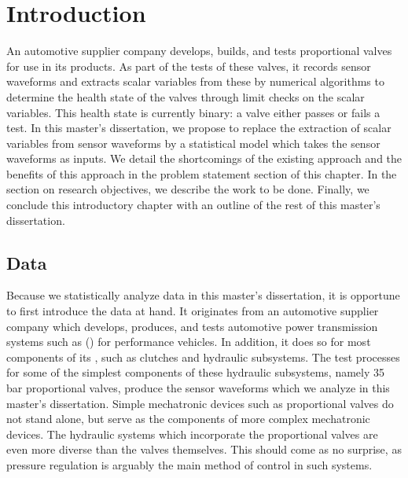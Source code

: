 \chapter{Introduction}

An automotive supplier company develops, builds, and tests proportional valves for use in its products.
As part of the tests of these valves, it records sensor waveforms and extracts scalar variables from these by numerical algorithms to determine the health state of the valves through limit checks on the scalar variables.
This health state is currently binary: a valve either passes or fails a test.
In this master's dissertation, we propose to replace the extraction of scalar variables from sensor waveforms by a statistical model which takes the sensor waveforms as inputs.
We detail the shortcomings of the existing approach and the benefits of this approach in the problem statement section of this chapter.
In the section on research objectives, we describe the work to be done.
Finally, we conclude this introductory chapter with an outline of the rest of this master's dissertation.

\section{Data}

Because we statistically analyze data in this master's dissertation, it is opportune to first introduce the data at hand.
It originates from an automotive supplier company which develops, produces, and tests automotive power transmission systems such as  () for performance vehicles.
In addition, it does so for most components of its , such as clutches and hydraulic subsystems.
The test processes for some of the simplest components of these hydraulic subsystems, namely 35 bar proportional valves, produce the sensor waveforms which we analyze in this master's dissertation.
Simple mechatronic devices such as proportional valves do not stand alone, but serve as the components of more complex mechatronic devices.
The hydraulic systems which incorporate the proportional valves are even more diverse than the valves themselves.
This should come as no surprise, as pressure regulation is arguably the main method of control in such systems.

